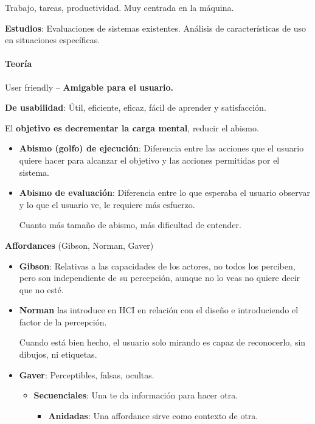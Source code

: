 Trabajo, tareas, productividad. Muy centrada en la máquina.

\textbf{Estudios}: Evaluaciones de sistemas existentes. Análisis de
características de uso en situaciones específicas.

\hypertarget{teoruxeda}{%
\paragraph{Teoría}\label{teoruxeda}}

User friendly -- \textbf{Amigable para el usuario.}

\textbf{De usabilidad}: Útil, eficiente, eficaz, fácil de aprender y
satisfacción.

El \textbf{objetivo es decrementar la carga mental}, reducir el abismo.

\begin{itemize}
\item
  \textbf{Abismo (golfo) de ejecución}: Diferencia entre las acciones
  que el usuario quiere hacer para alcanzar el objetivo y las acciones
  permitidas por el sistema.
\item
  \textbf{Abismo de evaluación}: Diferencia entre lo que esperaba el
  usuario observar y lo que el usuario ve, le requiere más esfuerzo.

  Cuanto más tamaño de abismo, más dificultad de entender.
\end{itemize}

\textbf{Affordances} (Gibson, Norman, Gaver)

\begin{itemize}
\item
  \textbf{Gibson}: Relativas a las capacidades de los actores, no todos
  los perciben, pero son independiente de su percepción, aunque no lo
  veas no quiere decir que no esté.
\item
  \textbf{Norman} las introduce en HCI en relación con el diseño e
  introduciendo el factor de la percepción.

  Cuando está bien hecho, el usuario solo mirando es capaz de
  reconocerlo, sin dibujos, ni etiquetas.
\item
  \textbf{Gaver}: Perceptibles, falsas, ocultas.

  \begin{itemize}
  \tightlist
  \item
    \textbf{Secuenciales}: Una te da información para hacer otra.

    \begin{itemize}
    \tightlist
    \item
      \textbf{Anidadas}: Una affordance sirve como contexto de otra.
    \end{itemize}
  \end{itemize}
\end{itemize}

